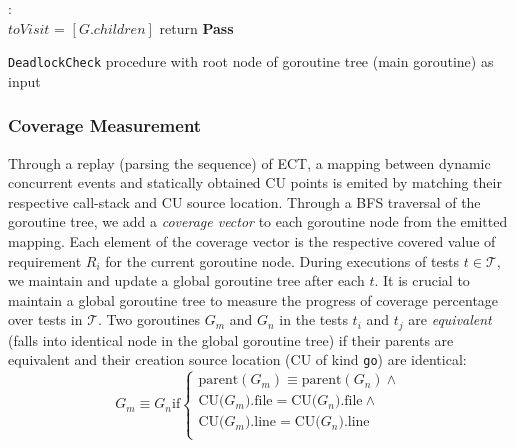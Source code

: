 \begin{small}
\begin{algorithm}[]
 \DontPrintSemicolon
 :{\\
 \Indp
    $toVisit$ = $[G.children]$\;
      return \textbf{Pass}\;
  }
 \caption{\texttt{DeadlockCheck} procedure with root node of goroutine tree (main goroutine) as input}
 \label{proc:deadlockCheck}
\end{algorithm}
\end{small}



\subsubsection{Coverage Measurement}
Through a replay (\ie parsing the sequence) of ECT, a mapping between dynamic concurrent events and statically obtained CU points is emited by matching their respective call-stack and CU source location.
%
Through a BFS traversal of the goroutine tree, we add a \textit{coverage vector} to each goroutine node from the emitted mapping. Each element of the coverage vector is the respective covered value of requirement $R_i$ for the current goroutine node.
%
During executions of tests $t \in \mathcal{T}$, we maintain and update a global goroutine tree after each $t$.
%
It is crucial to maintain a global goroutine tree to measure the progress of coverage percentage over tests in $\mathcal{T}$.
%
Two goroutines $G_m$ and $G_n$ in the tests $t_i$ and $t_j$ are \textit{equivalent} (\ie falls into identical node in the global goroutine tree) if their parents are equivalent and their creation source location (CU of kind \texttt{go}) are identical:
\begin{equation}
  G_m \equiv G_n   \text{if}
  \begin{cases}
    \text{parent}(G_m) \equiv \text{parent}(G_n)  \wedge \\
    \text{CU(}G_m\text{).file} = \text{CU(}G_n\text{).file}  \wedge\\
    \text{CU(}G_m\text{).line} = \text{CU(}G_n\text{).line} \\
  \end{cases}
\end{equation}





